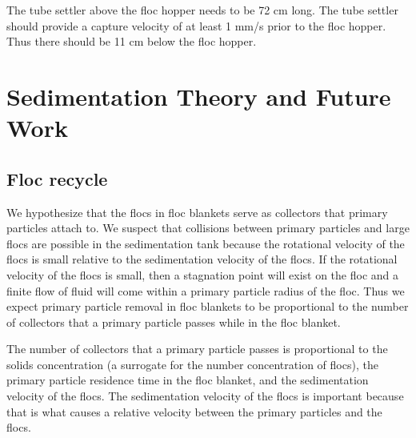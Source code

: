 \documentclass[letterpaper,10pt,english]{sphinxmanual}
\begin{document}
{\begin{sphinxVerbatim}[commandchars=\\\{\}]
\end{sphinxVerbatim}

The tube settler above the floc hopper needs to be 72 cm long. The tube settler should provide a capture velocity of at least 1 mm/s prior to the floc hopper. Thus there should be 11 cm below the floc hopper.


\chapter{Sedimentation Theory and Future Work}
\label{\detokenize{Sedimentation/Sed_Theory_and_Future_Work:sedimentation-theory-and-future-work}}\label{\detokenize{Sedimentation/Sed_Theory_and_Future_Work:id1}}\label{\detokenize{Sedimentation/Sed_Theory_and_Future_Work::doc}}

\section{Floc recycle}
\label{\detokenize{Sedimentation/Sed_Theory_and_Future_Work:floc-recycle}}\label{\detokenize{Sedimentation/Sed_Theory_and_Future_Work:id2}}
We hypothesize that the flocs in floc blankets serve as collectors that primary particles attach to. We suspect that collisions between primary particles and large flocs are possible in the sedimentation tank because the rotational velocity of the flocs is small relative to the sedimentation velocity of the flocs. If the rotational velocity of the flocs is small, then a stagnation point will exist on the floc and a finite flow of fluid will come within a primary particle radius of the floc. Thus we expect primary particle removal in floc blankets to be proportional to the number of collectors that a primary particle passes while in the floc blanket.

The number of collectors that a primary particle passes is proportional to the solids concentration (a surrogate for the number concentration of flocs), the primary particle residence time in the floc blanket, and the sedimentation velocity of the flocs. The sedimentation velocity of the flocs is important because that is what causes a relative velocity between the primary particles and the flocs.

}
\end{document}
